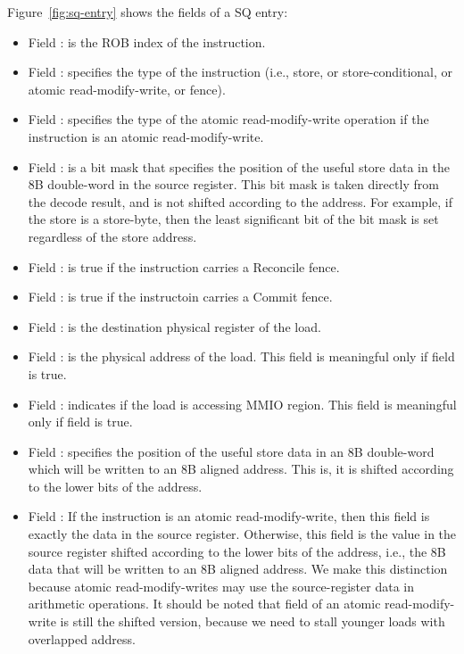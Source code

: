 Figure~\ref{fig:sq-entry} shows the fields of a SQ entry:
\begin{itemize}
    \item Field : is the ROB index of the instruction.
    \item Field : specifies the type of the instruction (i.e., store, or store-conditional, or atomic read-modify-write, or fence).
    \item Field : specifies the type of the atomic read-modify-write operation if the instruction is an atomic read-modify-write.
    \item Field : is a bit mask that specifies the position of the useful store data in the 8B double-word in the source register.
    This bit mask is taken directly from the decode result, and is not shifted according to the address.
    For example, if the store is a store-byte, then the least significant bit of the bit mask is set regardless of the store address.
    \item Field : is true if the instruction carries a Reconcile fence.
    \item Field : is true if the instructoin carries a Commit fence.
    \item Field : is the destination physical register of the load.
    \item Field : is the physical address of the load.
    This field is meaningful only if field  is true.
    \item Field : indicates if the load is accessing MMIO region.
    This field is meaningful only if field  is true.
    \item Field : specifies the position of the useful store data in an 8B double-word which will be written to an 8B aligned address.
    This is, it is  shifted according to the lower bits of the address.
    \item Field : If the instruction is an atomic read-modify-write, then this field is exactly the data in the source register.
    Otherwise, this field is the value in the source register shifted according to the lower bits of the address, i.e., the 8B data that will be written to an 8B aligned address.
    We make this distinction because atomic read-modify-writes may use the source-register data in arithmetic operations.
    It should be noted that field  of an atomic read-modify-write is still the shifted version, because we need to stall younger loads with overlapped address.

\end{itemize}
